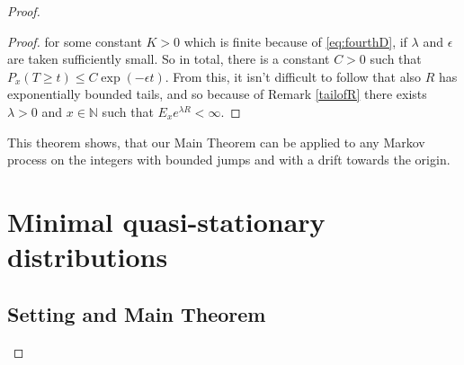 \documentclass[12pt,a4paper]{scrartcl}
\numberwithin{equation}{section}
\newcommand{\N}{\mathbb{N}} %
\begin{document}
\begin{proof}
\begin{proof}
for some constant $K > 0$ which is finite because of \eqref{eq:fourthD}, if $\lambda$ and $\epsilon$ are taken sufficiently small. So in total, there is a constant $C >0$ such that $P_x\left(T\geq t\right) \leq C \exp\left(-\epsilon t \right)$. From this, it isn't difficult to follow that also $R$ has exponentially bounded tails, and so because of Remark \ref{tailofR} there exists $\lambda > 0$ and $ x \in \N$ such that $E_x e^{\lambda R} < \infty.$

\end{proof}

This theorem shows, that our Main Theorem can be applied to any Markov process on the integers with bounded jumps and with a drift towards the origin.


%
%






\section{Minimal quasi-stationary distributions}

\subsection{Setting and Main Theorem}


\end{proof}
\end{document}
